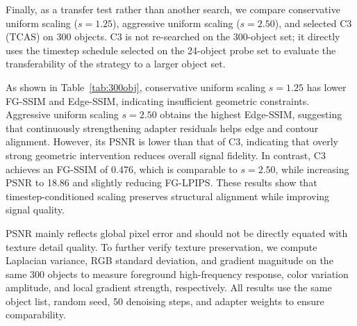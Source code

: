 \documentclass[times,twocolumn,final]{elsarticle}
\begin{document}
Finally, as a transfer test rather than another search, we compare conservative uniform scaling ($s = 1.25$), aggressive uniform scaling ($s = 2.50$), and selected C3 (TCAS) on 300 objects. C3 is not re-searched on the 300-object set; it directly uses the timestep schedule selected on the 24-object probe set to evaluate the transferability of the strategy to a larger object set.

\begin{table}[t]
\centering
\caption{Large-scale validation on 300 objects. Values are absolute metrics of generated outputs with respect to ground truth.}
\label{tab:300obj}
\end{table}


As shown in Table~\ref{tab:300obj}, conservative uniform scaling $s = 1.25$ has lower FG-SSIM and Edge-SSIM, indicating insufficient geometric constraints. Aggressive uniform scaling $s = 2.50$ obtains the highest Edge-SSIM, suggesting that continuously strengthening adapter residuals helps edge and contour alignment. However, its PSNR is lower than that of C3, indicating that overly strong geometric intervention reduces overall signal fidelity. In contrast, C3 achieves an FG-SSIM of 0.476, which is comparable to $s = 2.50$, while increasing PSNR to 18.86 and slightly reducing FG-LPIPS. These results show that timestep-conditioned scaling preserves structural alignment while improving signal quality.

PSNR mainly reflects global pixel error and should not be directly equated with texture detail quality. To further verify texture preservation, we compute Laplacian variance, RGB standard deviation, and gradient magnitude on the same 300 objects to measure foreground high-frequency response, color variation amplitude, and local gradient strength, respectively. All results use the same object list, random seed, 50 denoising steps, and adapter weights to ensure comparability.
\end{document}
